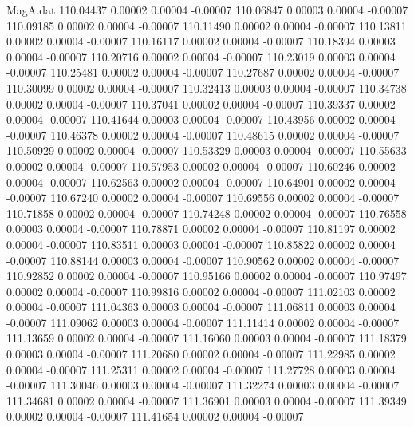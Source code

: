 \begin{filecontents}{MagA.dat}
 110.04437    0.00002    0.00004   -0.00007
 110.06847    0.00003    0.00004   -0.00007
 110.09185    0.00002    0.00004   -0.00007
 110.11490    0.00002    0.00004   -0.00007
 110.13811    0.00002    0.00004   -0.00007
 110.16117    0.00002    0.00004   -0.00007
 110.18394    0.00003    0.00004   -0.00007
 110.20716    0.00002    0.00004   -0.00007
 110.23019    0.00003    0.00004   -0.00007
 110.25481    0.00002    0.00004   -0.00007
 110.27687    0.00002    0.00004   -0.00007
 110.30099    0.00002    0.00004   -0.00007
 110.32413    0.00003    0.00004   -0.00007
 110.34738    0.00002    0.00004   -0.00007
 110.37041    0.00002    0.00004   -0.00007
 110.39337    0.00002    0.00004   -0.00007
 110.41644    0.00003    0.00004   -0.00007
 110.43956    0.00002    0.00004   -0.00007
 110.46378    0.00002    0.00004   -0.00007
 110.48615    0.00002    0.00004   -0.00007
 110.50929    0.00002    0.00004   -0.00007
 110.53329    0.00003    0.00004   -0.00007
 110.55633    0.00002    0.00004   -0.00007
 110.57953    0.00002    0.00004   -0.00007
 110.60246    0.00002    0.00004   -0.00007
 110.62563    0.00002    0.00004   -0.00007
 110.64901    0.00002    0.00004   -0.00007
 110.67240    0.00002    0.00004   -0.00007
 110.69556    0.00002    0.00004   -0.00007
 110.71858    0.00002    0.00004   -0.00007
 110.74248    0.00002    0.00004   -0.00007
 110.76558    0.00003    0.00004   -0.00007
 110.78871    0.00002    0.00004   -0.00007
 110.81197    0.00002    0.00004   -0.00007
 110.83511    0.00003    0.00004   -0.00007
 110.85822    0.00002    0.00004   -0.00007
 110.88144    0.00003    0.00004   -0.00007
 110.90562    0.00002    0.00004   -0.00007
 110.92852    0.00002    0.00004   -0.00007
 110.95166    0.00002    0.00004   -0.00007
 110.97497    0.00002    0.00004   -0.00007
 110.99816    0.00002    0.00004   -0.00007
 111.02103    0.00002    0.00004   -0.00007
 111.04363    0.00003    0.00004   -0.00007
 111.06811    0.00003    0.00004   -0.00007
 111.09062    0.00003    0.00004   -0.00007
 111.11414    0.00002    0.00004   -0.00007
 111.13659    0.00002    0.00004   -0.00007
 111.16060    0.00003    0.00004   -0.00007
 111.18379    0.00003    0.00004   -0.00007
 111.20680    0.00002    0.00004   -0.00007
 111.22985    0.00002    0.00004   -0.00007
 111.25311    0.00002    0.00004   -0.00007
 111.27728    0.00003    0.00004   -0.00007
 111.30046    0.00003    0.00004   -0.00007
 111.32274    0.00003    0.00004   -0.00007
 111.34681    0.00002    0.00004   -0.00007
 111.36901    0.00003    0.00004   -0.00007
 111.39349    0.00002    0.00004   -0.00007
 111.41654    0.00002    0.00004   -0.00007

\end{filecontents}
